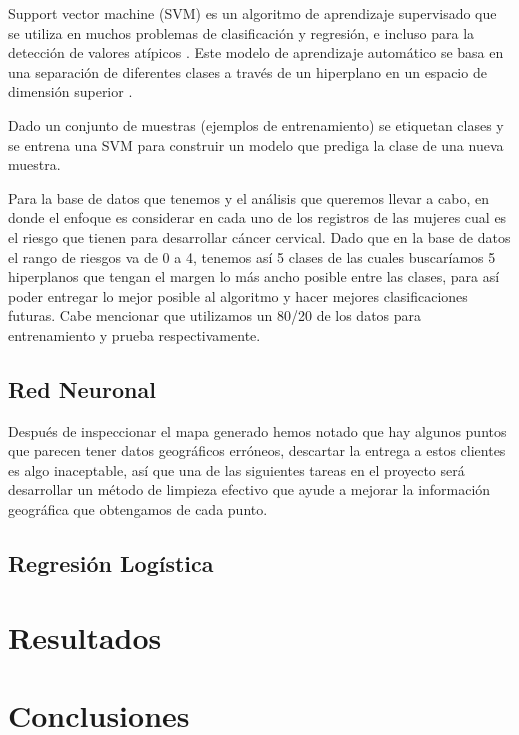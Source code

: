 \documentclass[journal]{IEEEtran}                                                          %
\begin{document}
            Support vector machine  (SVM) es un algoritmo de aprendizaje supervisado que se utiliza en muchos problemas de clasificación y regresión, e incluso para la detección de valores atípicos \cite{geron-2019}. Este modelo de aprendizaje automático se basa en una separación de diferentes clases a través de un hiperplano en un espacio de dimensión superior \cite{deisenroth2020mathematics}.

            Dado un conjunto de muestras (ejemplos de entrenamiento) se etiquetan clases y se entrena una SVM para construir un modelo que prediga la clase de una nueva muestra.

            Para la base de datos que tenemos y el análisis que queremos llevar a cabo, en donde el enfoque es considerar en cada uno de los registros de las mujeres cual es el riesgo que tienen para desarrollar cáncer cervical. Dado que en la base de datos el rango de riesgos va de 0 a 4, tenemos así 5 clases de las cuales buscaríamos 5 hiperplanos que tengan el margen lo más ancho posible entre las clases, para así poder entregar lo mejor posible al algoritmo y hacer mejores clasificaciones futuras. Cabe mencionar que utilizamos un 80/20 de los datos para entrenamiento y prueba respectivamente.

        \subsection{Red Neuronal} \label{neural-network}
            Después de inspeccionar el mapa generado hemos notado que hay algunos puntos que parecen tener datos geográficos erróneos, descartar la entrega a estos clientes es algo inaceptable, así que una de las siguientes tareas en el proyecto será desarrollar un método de limpieza efectivo que ayude a mejorar la información geográfica que obtengamos de cada punto.

        \subsection{Regresión Logística} \label{logistic}
            

    \section{Resultados} \label{resultados}

    \section{Conclusiones} \label{conclusiones}
        
\end{document}
